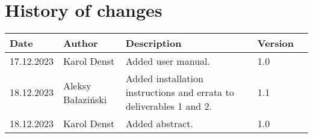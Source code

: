 \section{History of changes}
\begin{table}[H]
    \centering
    \begin{tabular}{lllll}
        \hline
        Date       & Author            & Description                                                         & Version & \\ \hline
        17.12.2023 & Karol Denst       & Added user manual.                                                  & 1.0     & \\
        18.12.2023 & Aleksy Bałaziński & Added installation instructions and errata to deliverables 1 and 2. & 1.1     & \\
        18.12.2023 & Karol Denst       & Added abstract.                                                     & 1.0     & \\ \hline
    \end{tabular}
\end{table}